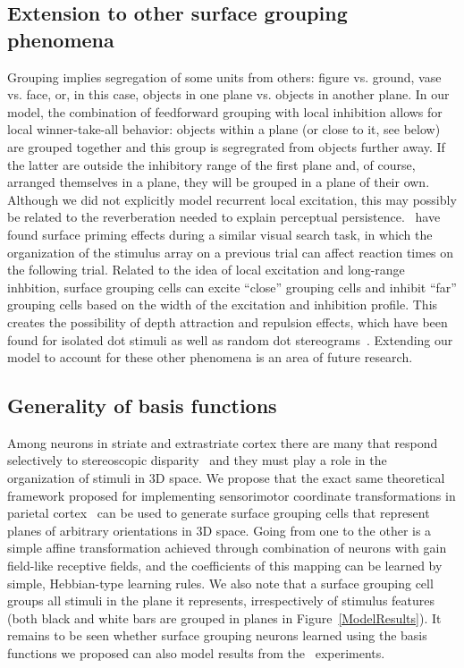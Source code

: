 \subsection{Extension to other surface grouping phenomena}

Grouping implies segregation of some units from others: figure vs. ground, vase vs. face, or, in this case, objects in one plane vs. objects in another plane. In our model, the combination of feedforward grouping with local inhibition allows for local winner-take-all behavior: objects within a plane (or close to it, see below) are grouped together and this group is segregrated from objects further away. If the latter are outside the inhibitory range of the first plane and, of course, arranged themselves in a plane, they will be grouped in a plane of their own. Although we did not explicitly model recurrent local excitation, this may possibly be related to the reverberation needed to explain perceptual persistence.~\citet{McCarley_He01} have found surface priming effects during a similar visual search task, in which the organization of the stimulus array on a previous trial can affect reaction times on the following trial. Related to the idea of local excitation and long-range inhbition, surface grouping cells can excite “close” grouping cells and inhibit “far” grouping cells based on the width of the excitation and inhibition profile. This creates the possibility of depth attraction and repulsion effects, which have been found for isolated dot stimuli as well as random dot stereograms~\citep{Stevenson_etal91}. Extending our model to account for these other phenomena is an area of future research.

\subsection{Generality of basis functions}

Among neurons in striate and extrastriate cortex there are many that respond selectively to stereoscopic disparity~\citep{Poggio_Fischer77,Cumming_DeAngelis01} and they must play a role in the organization of stimuli in 3D space. We propose that the exact same theoretical framework proposed for implementing sensorimotor coordinate transformations in parietal cortex~\citep{Salinas_Abbott95,Pouget_Sejnowski97b} can be used to generate surface grouping cells that represent planes of arbitrary orientations in 3D space. Going from one to the other is a simple affine transformation achieved through combination of neurons with gain field-like receptive fields, and the coefficients of this mapping can be learned by simple, Hebbian-type learning rules. We also note that a surface grouping cell groups all stimuli in the plane it represents, irrespectively of stimulus features (both black and white bars are grouped in planes in Figure~\ref{ModelResults}). It remains to be seen whether surface grouping neurons learned using the basis functions we proposed can also model results from the~\citet{He_Nakayama95} experiments.

